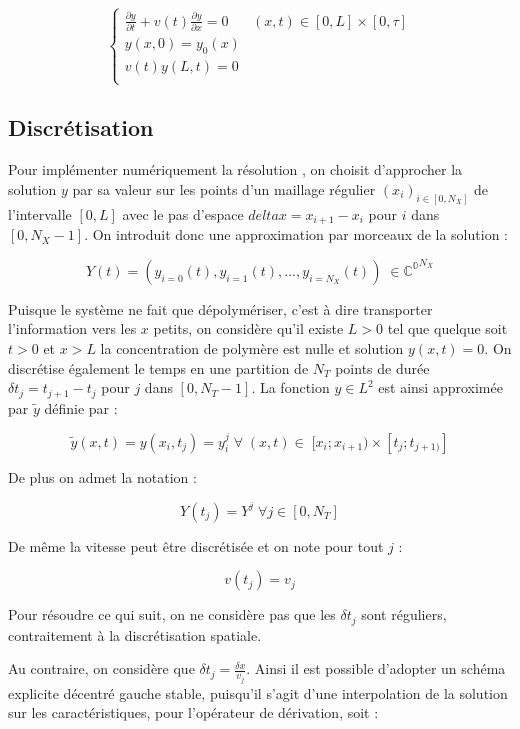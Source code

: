 \documentclass[a4paper]{article}
\begin{document}
\[
\begin{cases}
		\displaystyle \frac{\partial y}{\partial t}+ v(t) \frac{\partial y} {\partial x}  = 0 & (x,t) \in [0,L] \times [0, \tau] \\
        y(x,0) = y_{0} (x) \\
	    v(t)y(L,t) = 0 \\
\end{cases}
\]

\subsection{Discrétisation}

Pour implémenter numériquement la résolution , on choisit d'approcher la solution $y$ par sa valeur sur les points d'un maillage régulier $(x_i)_{i \in [0,N_X]}$ de l'intervalle $[0,L]$ avec le pas d'espace $ delta x = x_{i+1} - x_i$ pour $i$ dans $[0,N_X-1]$. On introduit donc une approximation par morceaux de la solution :

\[ Y(t) = (y_{i=0}(t), y_{i=1}(t),...,y_{i=N_X}(t)) \; \in \mathbb{C^0}^{N_X}\]

Puisque le système ne fait que dépolymériser, c'est à dire transporter l'information vers les $x$ petits, on considère qu'il existe $L>0$ tel que quelque soit $t>0$ et $x>L$ la concentration de polymère est nulle et solution $y(x,t)=0$. On discrétise également le temps en une partition de $N_T$ points de durée $\delta t_j = t_{j+1} - t_j$ pour $j$ dans $[0,N_T-1]$. La fonction $y \in L^2$ est ainsi approximée par $\tilde{y}$ définie par :

\[ \tilde{y} (x,t) = y(x_i,t_j)=y_i^j \; \forall \; (x,t) \in \; [x_i;x_{i+1}) \times [t_j;t_{j+1)}]\]

De plus on admet la notation :

\[Y(t_j) = Y^j \; \forall j \in [0,N_T] \]

De même la vitesse peut être discrétisée et on note pour tout $j$ :

\[ v(t_j) = v_j \]

Pour résoudre ce qui suit, on ne considère pas que les $\delta t_j$ sont réguliers, contraitement à la discrétisation spatiale.

Au contraire, on considère que $\displaystyle \delta t_j = \frac{\delta x}{v_{j}} $.
Ainsi il est possible d'adopter un schéma explicite décentré gauche stable, puisqu'il s'agit d'une interpolation de la solution sur les caractéristiques, pour l'opérateur de dérivation, soit :
\end{document}
